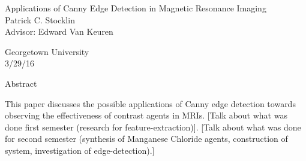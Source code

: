 \documentclass[a4paper,12pt]{article}
\begin{document}
	\begin{center}
	\vspace{0.5cm}
	\huge{Applications of Canny Edge Detection in Magnetic Resonance Imaging}\\
	\vspace{0.5cm}
	\small{Patrick C. Stocklin}\\

	\small{Advisor: Edward Van Keuren}

	\small{Georgetown University}\\

	\small{3/29/16}\\
	\end{center}

\begin{section}{Abstract}

This paper discusses the possible applications of Canny edge detection towards observing the effectiveness of contrast agents in MRIs. [Talk about what was done first semester (research for feature-extraction)]. [Talk about what was done for second semester (synthesis of Manganese Chloride agents, construction of system, investigation of edge-detection).]

\end{section}

\newpage

\end{document}
